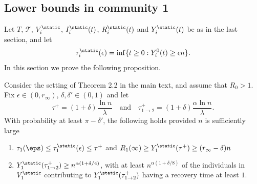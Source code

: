 \documentclass[11pt]{article}
\begin{document}
\subsection{Lower bounds in community 1} 

Let $T$, $\mathcal{T}$,  $V_i^{\static}$,  $I_i^{\static}(t)$,
$R_i^{\static}(t)$ and $Y_i^\static(t)$ be as in the last section, and let
\begin{equation}
\label{t12-in-community1}
\tau_i^{\static}(\epsilon)=\inf\{t\geq 0:Y_i^0(t)\geq \epsilon n\}.
\end{equation}
In this section we prove the following proposition.

\begin{proposition} \label{prop_lower_bounds_comm1}
    Consider the setting of Theorem 2.2 in the main text, and assume that $R_0>1$. Fix $\epsilon \in (0,r_\infty)$, $\delta, \delta'\in (0,1)$ and let
    \[
    \tau^+=({1+\delta})\frac {\ln n}\lambda\quad\text{and}\quad \tau^+_{1\to 2}=(1+\delta)\frac {\alpha \ln n}\lambda.
    \]
With probability at least $\pi - \delta'$, the following holds provided $n$ is sufficiently large
\begin{enumerate}
\item   $\tau_1(\eps)\leq \tau_1^{\static}(\epsilon)\leq \tau^+$ and
        $R_1(\infty)\ge Y_1^\static(\tau^+)\ge (r_\infty - \delta) n$
\item
       $       Y_1^{\static}(\tau^+_{1\to 2} )\geq n^{\alpha(1+\delta/4)}$,
       with at least $n^{\alpha(1+\delta/8)}$ of the individuals in $V_1^\static$ contributing to $Y_1^{\static}(\tau^+_{1\to 2} )$
       having a recovery time at least $1$.
\end{enumerate}
\end{proposition}
\end{document}
